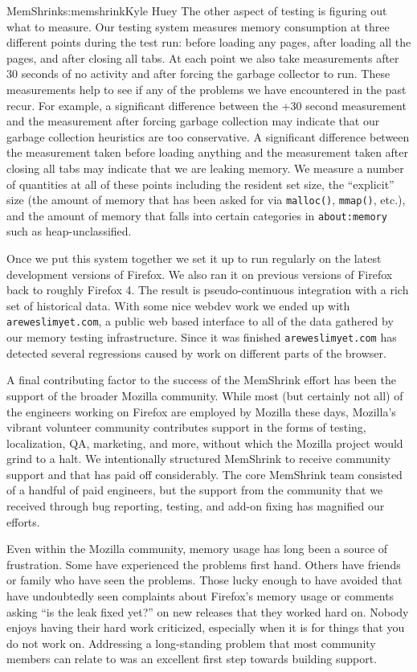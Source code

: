 \begin{aosachapter}{MemShrink}{s:memshrink}{Kyle Huey}
The other aspect of testing is figuring out what to measure. Our testing
system measures memory consumption at three different points during the
test run: before loading any pages, after loading all the pages, and
after closing all tabs. At each point we also take measurements after 30
seconds of no activity and after forcing the garbage collector to run.
These measurements help to see if any of the problems we have
encountered in the past recur. For example, a significant difference
between the +30 second measurement and the measurement after forcing
garbage collection may indicate that our garbage collection heuristics
are too conservative. A significant difference between the measurement
taken before loading anything and the measurement taken after closing
all tabs may indicate that we are leaking memory. We measure a number of
quantities at all of these points including the resident set size, the
``explicit'' size (the amount of memory that has been asked for via
\texttt{malloc()}, \texttt{mmap()}, etc.), and the amount of memory that
falls into certain categories in \texttt{about:memory} such as
heap-unclassified.

Once we put this system together we set it up to run regularly on the
latest development versions of Firefox. We also ran it on previous
versions of Firefox back to roughly Firefox 4. The result is
pseudo-continuous integration with a rich set of historical data. With
some nice webdev work we ended up with \texttt{areweslimyet.com}, a
public web based interface to all of the data gathered by our memory
testing infrastructure. Since it was finished \texttt{areweslimyet.com}
has detected several regressions caused by work on different parts of
the browser.


A final contributing factor to the success of the MemShrink effort has
been the support of the broader Mozilla community. While most (but
certainly not all) of the engineers working on Firefox are employed by
Mozilla these days, Mozilla's vibrant volunteer community contributes
support in the forms of testing, localization, QA, marketing, and more,
without which the Mozilla project would grind to a halt. We
intentionally structured MemShrink to receive community support and that
has paid off considerably. The core MemShrink team consisted of a
handful of paid engineers, but the support from the community that we
received through bug reporting, testing, and add-on fixing has magnified
our efforts.

Even within the Mozilla community, memory usage has long been a source
of frustration. Some have experienced the problems first hand. Others
have friends or family who have seen the problems. Those lucky enough to
have avoided that have undoubtedly seen complaints about Firefox's
memory usage or comments asking ``is the leak fixed yet?'' on new
releases that they worked hard on. Nobody enjoys having their hard work
criticized, especially when it is for things that you do not work on.
Addressing a long-standing problem that most community members can
relate to was an excellent first step towards building support.


\end{aosachapter}
